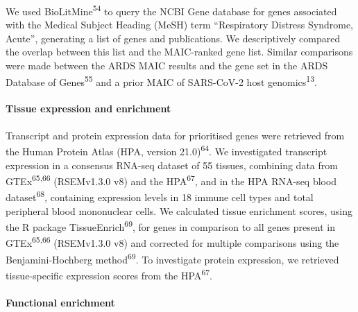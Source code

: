 \documentclass[
  11,
  a4paper,
]{article}
\let\oldparagraph\paragraph
\renewcommand{\paragraph}[1]{\oldparagraph{#1}\mbox{}}
\begin{document}
We used BioLitMine\textsuperscript{54} to query the NCBI Gene database
for genes associated with the Medical Subject Heading (MeSH) term
``Respiratory Distress Syndrome, Acute'', generating a list of genes and
publications. We descriptively compared the overlap between this list
and the MAIC-ranked gene list. Similar comparisons were made between the
ARDS MAIC results and the gene set in the ARDS Database of
Genes\textsuperscript{55} and a prior MAIC of SARS-CoV-2 host
genomics\textsuperscript{13}.

\hypertarget{tissue-expression-and-enrichment}{%
\paragraph{Tissue expression and
enrichment}\label{tissue-expression-and-enrichment}}

Transcript and protein expression data for prioritised genes were
retrieved from the Human Protein Atlas (HPA, version
21.0)\textsuperscript{64}. We investigated transcript expression in a
consensus RNA-seq dataset of 55 tissues, combining data from
GTEx\textsuperscript{65,66} (RSEMv1.3.0 v8) and the
HPA\textsuperscript{67}, and in the HPA RNA-seq blood
dataset\textsuperscript{68}, containing expression levels in 18 immune
cell types and total peripheral blood mononuclear cells. We calculated
tissue enrichment scores, using the R package
TissueEnrich\textsuperscript{69}, for genes in comparison to all genes
present in GTEx\textsuperscript{65,66} (RSEMv1.3.0 v8) and corrected for
multiple comparisons using the Benjamini-Hochberg
method\textsuperscript{69}. To investigate protein expression, we
retrieved tissue-specific expression scores from the
HPA\textsuperscript{67}.

\hypertarget{functional-enrichment-1}{%
\paragraph{Functional enrichment}\label{functional-enrichment-1}}
\end{document}
